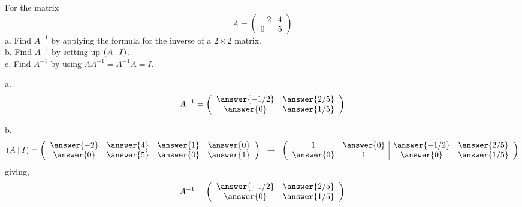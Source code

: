 \documentclass{ximera}
\author{Parisa Fatheddin}
\author{Parisa Fatheddin}
\begin{document}
\begin{exercise}
For the matrix
\[A= \left(\begin{array}{cc}
-2 & 4 \\
0 & 5
\end{array}\right)
\]
a. Find $A^{-1}$ by applying the formula for the inverse of a $2\times 2$ matrix.\\
b. Find $A^{-1}$ by setting up $(A \hspace{.08cm}|\hspace{.08cm} I)$. \\
c. Find $A^{-1}$ by using $AA^{-1}= A^{-1}A=I$.

\begin{prompt}
a. \[
A^{-1} = \left(\begin{array}{cc} \answer{-1/2} & \answer{2/5}\\
\answer{0} & \answer{1/5}
\end{array}\right)
\]

b.
\[ (A \hspace{.08cm}|\hspace{.08cm} I ) = \left(\begin{array}{cc|cc}
\answer{-2} & \answer{4} & \answer{1} & \answer{0}\\
\answer{0} & \answer{5} & \answer{0} & \answer{1}\\
\end{array} \right)
\hspace{.2cm} \rightarrow \hspace{.2cm}
\left(\begin{array}{cc|cc}
1 & \answer{0} & \answer{-1/2} & \answer{2/5}\\
\answer{0} & 1 & \answer{0} & \answer{1/5}
\end{array} \right)
\]
giving,
\[A^{-1} = \left(\begin{array}{cc}
\answer{-1/2} & \answer{2/5}\\
\answer{0} & \answer{1/5}
\end{array} \right)\]


\end{prompt}
\end{exercise}
\end{document}
